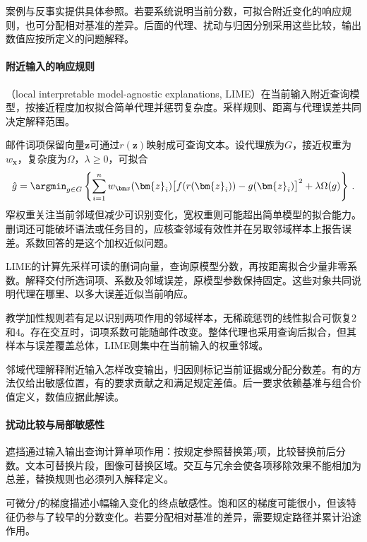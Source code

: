案例与反事实提供具体参照。若要系统说明当前分数，可拟合附近变化的响应规则，也可分配相对基准的差异。后面的代理、扰动与归因分别采用这些比较，输出数值应按所定义的问题解释。

\paragraph{附近输入的响应规则}
\label{sec:interpretability-local-neighborhood}

（local interpretable model-agnostic explanations, LIME）在当前输入附近查询模型，按接近程度加权拟合简单代理并惩罚复杂度。采样规则、距离与代理误差共同决定解释范围。

邮件词项保留向量$\bm z$可通过$r(\bm z)$映射成可查询文本。设代理族为$G$，接近权重为$w_{\bm x}$，复杂度为$\Omega$，$\lambda\geq0$，可拟合
\begin{equation}
 \hat g=\argmin_{g\in G}\left\{
 \sum_{i=1}^{n}w_{\bm x}(\bm{z}_i)
 \bigl[f(r(\bm{z}_i))-g(\bm{z}_i)\bigr]^2
 +\lambda\Omega(g)\right\}\, .
 \label{eq:interpretability-lime}
\end{equation}
窄权重关注当前邻域但减少可识别变化，宽权重则可能超出简单模型的拟合能力。删词还可能破坏语法或任务目的，应核查邻域有效性并在另取邻域样本上报告误差。系数回答的是这个加权近似问题。

LIME的计算先采样可读的删词向量，查询原模型分数，再按距离拟合少量非零系数。解释交付所选词项、系数及邻域误差，原模型参数保持固定。这些对象共同说明代理在哪里、以多大误差近似当前响应。

教学加性规则若有足以识别两项作用的邻域样本，无稀疏惩罚的线性拟合可恢复2和4。存在交互时，词项系数可能随邮件改变。整体代理也采用查询后拟合，但其样本与误差覆盖总体，LIME则集中在当前输入的权重邻域。

邻域代理解释附近输入怎样改变输出，归因则标记当前证据或分配分数差。有的方法仅给出敏感位置，有的要求贡献之和满足规定差值。后一要求依赖基准与组合价值定义，数值应据此解读。

\paragraph{扰动比较与局部敏感性}

遮挡通过输入输出查询计算单项作用：按规定参照替换第$j$项，比较替换前后分数。文本可替换片段，图像可替换区域。交互与冗余会使各项移除效果不能相加为总差，替换规则也必须列入解释定义。

可微分$f$的梯度描述小幅输入变化的终点敏感性。饱和区的梯度可能很小，但该特征仍参与了较早的分数变化。若要分配相对基准的差异，需要规定路径并累计沿途作用。


